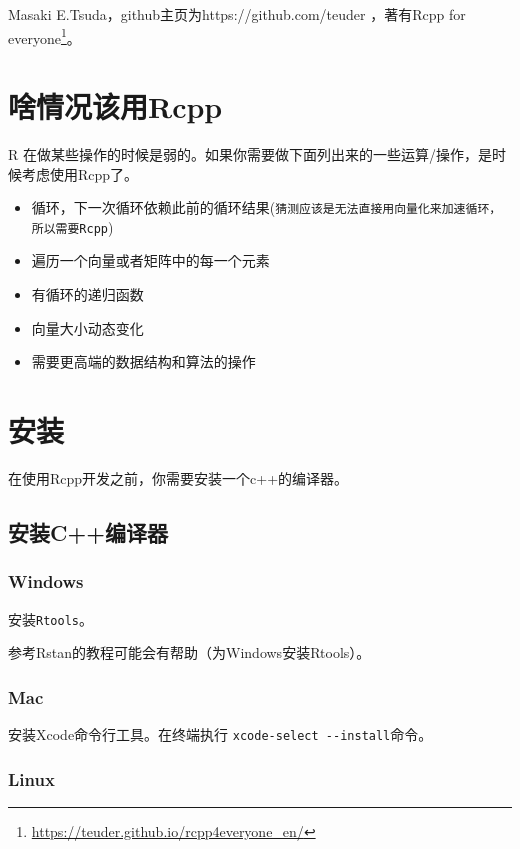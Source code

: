 \documentclass[]{ctexbook}
\providecommand{\tightlist}{%
  \setlength{\itemsep}{0pt}\setlength{\parskip}{0pt}}
\renewcommand{\href}[2]{#2\footnote{\url{#1}}}
\begin{document}
Masaki E.Tsuda，github主页为https://github.com/teuder
，著有\href{https://teuder.github.io/rcpp4everyone_en/}{Rcpp for
everyone}。

\mainmatter

\chapter{啥情况该用Rcpp}\label{situations}

R
在做某些操作的时候是弱的。如果你需要做下面列出来的一些运算/操作，是时候考虑使用Rcpp了。

\begin{itemize}
\tightlist
\item
  循环，下一次循环依赖此前的循环结果(\texttt{猜测应该是无法直接用向量化来加速循环，所以需要Rcpp})
\item
  遍历一个向量或者矩阵中的每一个元素
\item
  有循环的递归函数
\item
  向量大小动态变化
\item
  需要更高端的数据结构和算法的操作
\end{itemize}

\chapter{安装}\label{install}

在使用Rcpp开发之前，你需要安装一个c++的编译器。

\section{安装C++编译器}\label{cppcompiler}

\subsection{Windows}\label{cppcwindows}

安装\texttt{Rtools}。

参考Rstan的教程可能会有帮助（为Windows安装Rtools）。

\subsection{Mac}\label{cppmac}

安装Xcode命令行工具。在终端执行 \texttt{xcode-select\ -\/-install}命令。

\subsection{Linux}\label{cpplinux}
\end{document}
